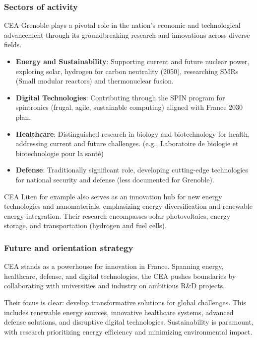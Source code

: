 \subsubsection{Sectors of activity}

CEA Grenoble plays a pivotal role in the nation's economic and technological 
advancement through its groundbreaking research and innovations across diverse fields.

\begin{itemize}
  \item \textbf{Energy and Sustainability}: Supporting current and future nuclear power, exploring solar, hydrogen for carbon
   neutrality (2050), researching SMRs (Small modular reactors) and thermonuclear fusion.
  \item \textbf{Digital Technologies}: Contributing through the SPIN program for spintronics (frugal, agile, sustainable computing)
   aligned with France 2030 plan.
  \item \textbf{Healthcare}: Distinguished research in biology and biotechnology for health, addressing current and future challenges.
   (e.g., Laboratoire de biologie et biotechnologie pour la santé)
  \item \textbf{Defense}: Traditionally significant role, developing cutting-edge technologies for national security and defense 
  (less documented for Grenoble).
\end{itemize}

CEA Liten for example also serves as an innovation hub for new energy technologies and nanomaterials, emphasizing energy diversification
 and renewable energy integration. Their research encompasses solar photovoltaics, energy storage, and transportation (hydrogen and fuel
 cells).


\subsubsection{Future and orientation strategy}

\medskip

 CEA stands as a powerhouse for innovation in France.
 Spanning energy, healthcare, defense, and digital technologies, the CEA pushes boundaries by collaborating with universities
 and industry on ambitious R\&D projects.

\medskip

Their focus is clear: develop transformative solutions for global challenges. 
 This includes renewable energy sources, innovative healthcare systems, advanced defense solutions, 
 and disruptive digital technologies. Sustainability is paramount, with research prioritizing energy 
 efficiency and minimizing environmental impact.

